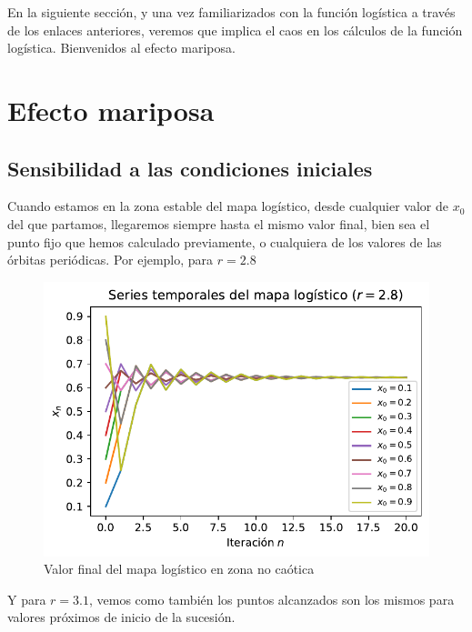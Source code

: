 \documentclass[
  10pt,
  a4paper,
  DIV=11,
  numbers=noendperiod,
  open=any]{scrreprt}
\numberwithin{equation}{chapter}
\numberwithin{equation}{section}
\renewcommand{\[}{\begin{equation}}
\renewcommand{\]}{\end{equation}}
\begin{document}
En la siguiente sección, y una vez familiarizados con la función logística a través de los enlaces anteriores, veremos que implica el caos en los cálculos de la función logística. Bienvenidos al efecto mariposa. 

\chapter{Efecto mariposa}\label{efecto-mariposa}

\section{Sensibilidad a las condiciones
iniciales}\label{sec-sensibilidad}

Cuando estamos en la zona estable del mapa logístico, desde cualquier
valor de \(x_0\) del que partamos, llegaremos siempre hasta el mismo
valor final, bien sea el punto fijo que hemos calculado previamente, o
cualquiera de los valores de las órbitas periódicas. Por ejemplo, para
\(r=2.8\)

\begin{figure}[h]
  \centering
  \includegraphics[keepaspectratio]{01-logistica/lyapunov_files/figure-pdf/cell-2-output-1.pdf}
  \caption{Valor final del mapa logístico en zona no caótica}
\end{figure} 

Y para \(r=3.1\), vemos como también los puntos alcanzados son los
mismos para valores próximos de inicio de la sucesión.
\end{document}
